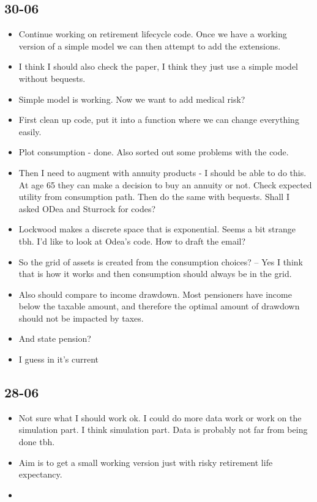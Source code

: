 \documentclass[12pt]{article}
\begin{document}
\subsection{\textbf{30-06}}
\begin{itemize}


  \item Continue working on retirement lifecycle code.
        Once we have a working version of a simple model we can then attempt
        to add the extensions.

  \item I think I should also check the \cite{odea_sturrock_rest_2023} paper,
        I think they just use a simple model without bequests.

  \item Simple model is working. Now we want to add medical risk?
  \item First clean up code, put it into a function where we can change
        everything easily.

  \item Plot consumption - done. Also sorted out some problems with the code.
  \item Then I need to augment with annuity products -
        I should be able to do this. At age 65 they can make a decision to buy an annuity or not.
        Check expected utility from consumption path.
        Then do the same with bequests.
        Shall I asked ODea and Sturrock for codes?

  \item Lockwood makes a discrete space that is exponential.
        Seems a bit strange tbh. I'd like to look at Odea's code.
        How to draft the email?

  \item So the grid of assets is created from the consumption choices?
        -- Yes I think that is how it works and then consumption should always be in the grid.


  \item Also should compare to income drawdown. Most pensioners have income
        below the taxable amount, and therefore the optimal amount of drawdown
        should not be impacted by taxes.
  \item And state pension?
  \item I guess in it's current

\end{itemize}

\subsection{\textbf{28-06}}
\begin{itemize}
  \item Not sure what I should work ok. I could do more data work or work on the simulation part.
        I think simulation part. Data is probably not far from being done tbh.

  \item Aim is to get a small working version just with risky retirement life expectancy.
  \item
\end{itemize}
\end{document}
